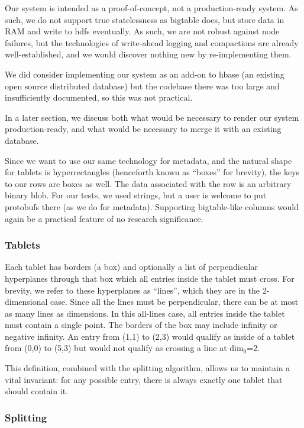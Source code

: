 \documentclass[11pt]{article}
\begin{document}
Our system is intended as a proof-of-concept, not a production-ready system. As such, we do not support true statelessness as bigtable does, but store data in RAM and write to hdfs eventually. As such, we are not robust against node failures, but the technologies of write-ahead logging and compactions are already well-established, and we would discover nothing new by re-implementing them.

We did consider implementing our system as an add-on to hbase (an existing open source distributed database) but the codebase there was too large and insufficiently documented, so this was not practical.

In a later section, we discuss both what would be necessary to render our system production-ready, and what would be necessary to merge it with an existing database.

Since we want to use our same technology for metadata, and the natural shape for tablets is hyperrectangles (henceforth known as ``boxes'' for brevity), the keys to our rows are boxes as well. The data associated with the row is an arbitrary binary blob. For our tests, we used strings, but a user is welcome to put protobufs there (as we do for metadata). Supporting bigtable-like columns would again be a practical feature of no research significance.

\subsubsection{Tablets}

Each tablet has borders (a box) and optionally a list of perpendicular hyperplanes through that box which all entries inside the tablet must cross.  For brevity, we refer to these hyperplanes as ``lines'', which they are in the 2-dimensional case.   Since all the lines must be perpendicular, there can be at most as many lines as dimensions. In this all-lines case, all entries inside the tablet must contain a single point. The borders of the box may include infinity or negative infinity. An entry from (1,1) to (2,3) would qualify as inside of a tablet from (0,0) to (5,3) but would not qualify as crossing a line at dim$_0$=2.

This definition, combined with the splitting algorithm, allows us to maintain a vital invariant: for any possible entry, there is always exactly one tablet that should contain it.

\subsubsection{Splitting}
\end{document}

